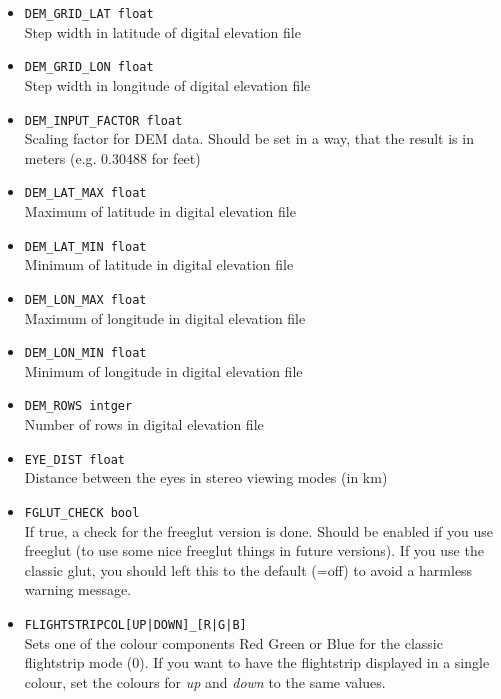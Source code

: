 \begin{itemize}
\item \texttt{DEM\_GRID\_LAT float} \\
Step width in latitude of digital elevation file

\item \texttt{DEM\_GRID\_LON float} \\
Step width in longitude of digital elevation file

\item \texttt{DEM\_INPUT\_FACTOR float} \\
Scaling factor for DEM data. Should be set in a way, that the result is in meters (e.g. 0.30488 for feet)

\item \texttt{DEM\_LAT\_MAX float} \\
Maximum of latitude in digital elevation file

\item \texttt{DEM\_LAT\_MIN float} \\
Minimum of latitude in digital elevation file

\item \texttt{DEM\_LON\_MAX float} \\
Maximum of longitude in digital elevation file

\item \texttt{DEM\_LON\_MIN float} \\
Minimum of longitude in digital elevation file

\item \texttt{DEM\_ROWS intger} \\
Number of rows in digital elevation file

\item \texttt{EYE\_DIST float} \\
Distance between the eyes in stereo viewing modes (in km)

\item \texttt{FGLUT\_CHECK bool} \\
If true, a check for the freeglut version is done. Should be enabled if you use freeglut (to use
some nice freeglut things in future versions). If you use the classic glut, you should left this to
the default (=off) to avoid a harmless warning message.

\item \texttt{FLIGHTSTRIPCOL[UP|DOWN]\_[R|G|B]}\\
Sets one of the colour components Red Green or Blue for the classic flightstrip mode (0). If you want to have the flightstrip displayed in
a single colour, set the colours for \emph{up} and \emph{down} to the same values.


\end{itemize}
